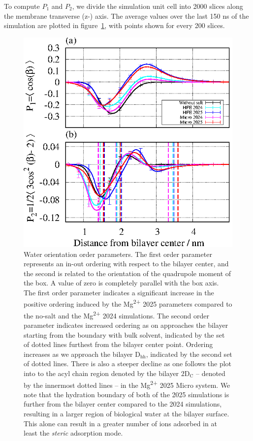 \documentclass[journal=langd5,manuscript=article]{achemso}
\newcommand{\mg}{Mg\textsuperscript{2+}}
\newcommand{\dhh}{$\text{D}_\text{hh}$}
\newcommand{\dc}{$\text{2D}_\text{C}$}
\begin{document}
To compute $P_1$ and $P_2$, we divide the simulation unit cell into 2000 slices along the membrane transverse (z-) axis.  
The average values over the last 150 ns of the simulation are plotted in figure~\ref{fig:h2order}, with points shown for every 200 slices. 

\begin{figure}[H]
    \caption{Water orientation order parameters. The first
    order parameter represents an in-out ordering with respect to the bilayer center, and the second is related to the orientation of the quadrupole moment of the box. A value of zero is completely
    parallel with the box axis.  
    The first order parameter indicates a significant increase in the positive ordering induced by the \mg{ 2025} parameters compared to the no-salt and the
        \mg{ 2024} simulations.  The second order parameter indicates increased ordering as on approaches the bilayer starting from the boundary with bulk solvent, indicated by the set of dotted lines
        furthest from the bilayer center point. Ordering increases as we approach the bilayer \dhh{}, indicated by the second set of dotted lines. There is also a steeper decline as one follows the plot into to the acyl chain region denoted by the bilayer \dc{} -- denoted by the innermost dotted lines --  in the
\mg{ 2025} Micro system. We note that the hydration boundary of both of the 2025 simulations is further from the bilayer center compared to the 2024 simulations, resulting in a larger region of biological water
at the bilayer surface. This alone can result in a greater number of ions adsorbed in at least the \emph{steric} adsorption mode.} 
    \label{fig:h2order}
    \includegraphics{figures/Figure_1.eps}
\end{figure}
\end{document}
